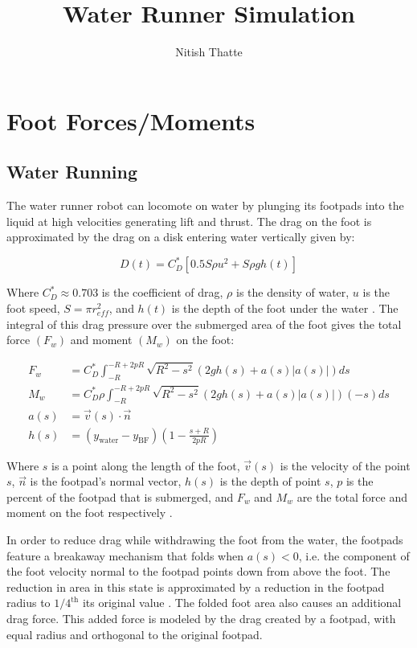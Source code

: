 \documentclass[letterpaper]{article}
\title{Water Runner Simulation}
\author{Nitish Thatte}
\begin{document}
\maketitle

\section{Foot Forces/Moments}
\subsection{Water Running}
The water runner robot can locomote on water by plunging its footpads into the liquid at high velocities generating lift and thrust. The drag on the foot is approximated by the drag on a disk entering water vertically given by:

\begin{equation}
	D(t) = C_D^* [0.5 S \rho u^2 + S \rho g h(t)]
\end{equation}

\noindent Where $C_D^* \approx 0.703$ is the coefficient of drag, $\rho$ is the density of water, $u$ is the foot speed, $S = \pi r_{eff}^2$, and $h(t)$ is the depth of the foot under the water \cite{Glasheen1996a}. The integral of this drag pressure over the submerged area of the foot gives the total force $(F_w)$ and moment $(M_w)$ on the foot:

\begin{align}
F_w &= C_D^* \int_{-R}^{-R+2pR} \sqrt{R^2 - s^2} (2gh(s) + a(s)|a(s)|) ds \label{eq:footF}\\
M_w &= C_D^* \rho \int_{-R}^{-R + 2pR} \sqrt{R^2 - s^2} (2gh(s) + a(s)|a(s)|)(-s) ds \label{eq:footM} \\
a(s) &= \vec{v}(s) \cdot \vec{n} \\
h(s) &= (y_\mathrm{water} - y_\mathrm{BF} ) \left( 1 - \frac{s + R}{2 p R} \right)
\end{align}

\noindent Where $s$ is a point along the length of the foot, $\vec{v}(s)$ is the velocity of the point $s$, $\vec{n}$ is the footpad's normal vector, $h(s)$ is the depth of point $s$, $p$ is the percent of the footpad that is submerged, and $F_w$ and $M_w$ are the total force and moment on the foot respectively \cite{Floyd2008}.

In order to reduce drag while withdrawing the foot from the water, the footpads feature a breakaway mechanism that folds when $a(s) < 0$, i.e. the component of the foot velocity normal to the footpad points down from above the foot. The reduction in area in this state is approximated by a reduction in the footpad radius to $1/4^\textrm{th}$ its original value \cite{Floyd2009}. The folded foot area also causes an additional drag force. This added force is modeled by the drag created by a footpad, with equal radius and orthogonal to the original footpad.
\end{document}
